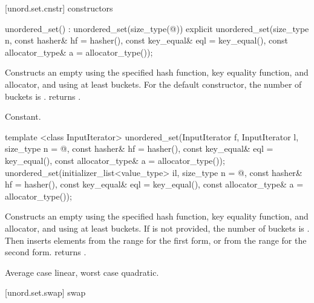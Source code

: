 [unord.set.cnstr]{ constructors}

%
\begin{itemdecl}
unordered_set() : unordered_set(size_type(@\seebelow@)) { }
explicit unordered_set(size_type n,
                       const hasher& hf = hasher(),
                       const key_equal& eql = key_equal(),
                       const allocator_type& a = allocator_type());
\end{itemdecl}

\begin{itemdescr}
\pnum
\effects Constructs an empty  using the
specified hash function, key equality function, and allocator, and
using at least  buckets.  For the default constructor,
the number of buckets is .
 returns .

\pnum
\complexity Constant.
\end{itemdescr}

%
\begin{itemdecl}
template <class InputIterator>
  unordered_set(InputIterator f, InputIterator l,
                size_type n = @\seebelow@,
                const hasher& hf = hasher(),
                const key_equal& eql = key_equal(),
                const allocator_type& a = allocator_type());
unordered_set(initializer_list<value_type> il,
              size_type n = @\seebelow@,
              const hasher& hf = hasher(),
              const key_equal& eql = key_equal(),
              const allocator_type& a = allocator_type());
\end{itemdecl}

\begin{itemdescr}
\pnum
\effects Constructs an empty  using the
specified hash function, key equality function, and allocator, and
using at least  buckets. If  is not
provided, the number of buckets is . Then
inserts elements from the range 
for the first form, or from the range 
 for the second form.
 returns .

\pnum
\complexity Average case linear, worst case quadratic.
\end{itemdescr}

[unord.set.swap]{ swap}

